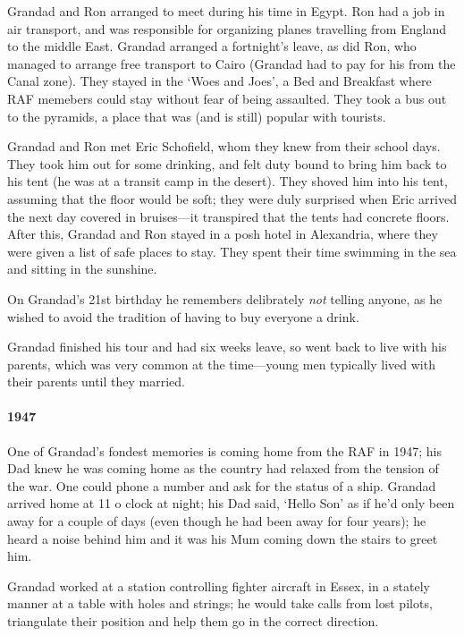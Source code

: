 Grandad and Ron arranged to meet during his time in Egypt. Ron had a job 
in air transport, and was responsible for organizing planes travelling from England 
to the middle East. Grandad arranged a fortnight's leave, as did Ron, who 
managed to arrange free transport to Cairo (Grandad had to pay for his from 
the Canal zone). They stayed in the `Woes and Joes', a Bed and Breakfast where RAF memebers 
could stay without fear of being assaulted. They took a bus out to the pyramids, a place 
that was (and is still) popular with tourists.

Grandad and Ron met Eric Schofield, whom they knew from their school days. They
took him out for some drinking, and felt duty bound to bring him back to his tent (he was 
at a transit camp in the desert). They shoved him into his tent, assuming that 
the floor would be soft; they were duly surprised when Eric arrived the next day 
covered in bruises---it transpired that the tents had concrete floors. After this, 
Grandad and Ron stayed in a posh hotel in Alexandria, where they were given 
a list of safe places to stay. They spent their time swimming in the sea 
and sitting in the sunshine.

On Grandad's 21st birthday he remembers delibrately \emph{not} telling anyone, as 
he wished to avoid the tradition of having to buy everyone a drink.

  Grandad finished his tour and had six weeks leave, so went back to live with his parents, which was 
  very common at the time---young men typically lived with their parents until they married. 

  \paragraph{1947} One of Grandad's fondest memories is coming home from the RAF in 1947; his Dad knew 
he was coming home  as the country had relaxed from the tension of the war. 
One could phone a number and ask for the status of a ship. Grandad arrived home at 
11 o clock at night; his Dad said, `Hello Son' as if he'd only been away for 
a couple of days (even though he had been away for four years); he heard a noise 
behind him and it was his Mum coming down the stairs to greet him.

  Grandad worked at a station controlling fighter aircraft in Essex, in a stately manner at a table 
  with holes and strings; he would take calls from lost pilots, triangulate their position
  and help them go in the correct direction. 

